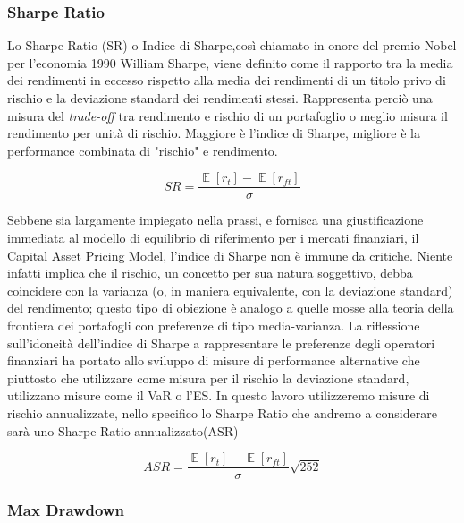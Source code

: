 \documentclass[]{article}
\DeclareMathOperator{\E}{\mathbb{E}}
\begin{document}
\subsubsection*{Sharpe Ratio}
Lo Sharpe Ratio (SR) o Indice di Sharpe,così chiamato in onore del premio Nobel per l'economia 1990 William Sharpe,
viene definito come il rapporto tra la media dei rendimenti in eccesso rispetto alla media dei rendimenti di un titolo privo di rischio e la deviazione standard dei rendimenti stessi. Rappresenta perciò una misura del \textit{trade-off} tra rendimento e rischio di un portafoglio o meglio misura il rendimento per unità di rischio. Maggiore è l'indice di Sharpe, migliore è la performance combinata di "rischio" e rendimento.

\begin{equation}
	SR = 
	\frac{\E{[r_t]}-\E{[r_{ft}]}}{\sigma}
\end{equation}

Sebbene sia largamente impiegato nella prassi, e fornisca una giustificazione immediata al modello di equilibrio di riferimento per i mercati finanziari, il Capital Asset Pricing Model, l'indice di Sharpe non è immune da critiche.
Niente infatti implica che il rischio, un concetto per sua natura soggettivo, debba coincidere con la varianza (o, in maniera equivalente, con la deviazione standard) del rendimento; questo tipo di obiezione è analogo a quelle mosse alla teoria della frontiera dei portafogli con preferenze di tipo media-varianza. La riflessione sull'idoneità dell'indice di Sharpe a rappresentare le preferenze degli operatori finanziari ha portato allo sviluppo di misure di performance alternative che piuttosto che utilizzare come misura per il rischio la deviazione standard, utilizzano misure come il VaR o l'ES.
In questo lavoro utilizzeremo misure di rischio annualizzate, nello specifico lo Sharpe Ratio che andremo a considerare sarà uno Sharpe Ratio annualizzato(ASR)

\begin{equation}
	ASR = 
	\frac{\E{[r_t]}-\E{[r_{ft}]}}{\sigma}\sqrt{252}
\end{equation}

\subsubsection*{Max Drawdown}
\end{document}
